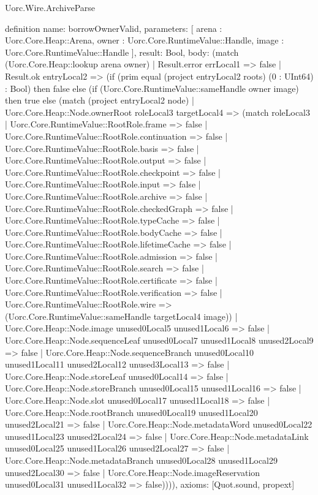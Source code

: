 \begin{lexlean}{Uorc.Wire.ArchiveParse}
\begin{semanticmodule}
definition{
  name: borrowOwnerValid,
  parameters: [
    arena : Uorc.Core.Heap::Arena,
    owner : Uorc.Core.RuntimeValue::Handle,
    image : Uorc.Core.RuntimeValue::Handle
  ],
  result: Bool,
  body: (match (Uorc.Core.Heap::lookup arena owner)
    | Result.error errLocal1 => false
    | Result.ok entryLocal2 => (if (prim equal (project entryLocal2 roots) (0 : UInt64) : Bool) then false else (if (Uorc.Core.RuntimeValue::sameHandle owner image) then true else (match (project entryLocal2 node)
      | Uorc.Core.Heap::Node.ownerRoot roleLocal3 targetLocal4 => (match roleLocal3
        | Uorc.Core.RuntimeValue::RootRole.frame => false
        | Uorc.Core.RuntimeValue::RootRole.continuation => false
        | Uorc.Core.RuntimeValue::RootRole.basis => false
        | Uorc.Core.RuntimeValue::RootRole.output => false
        | Uorc.Core.RuntimeValue::RootRole.checkpoint => false
        | Uorc.Core.RuntimeValue::RootRole.input => false
        | Uorc.Core.RuntimeValue::RootRole.archive => false
        | Uorc.Core.RuntimeValue::RootRole.checkedGraph => false
        | Uorc.Core.RuntimeValue::RootRole.typeCache => false
        | Uorc.Core.RuntimeValue::RootRole.bodyCache => false
        | Uorc.Core.RuntimeValue::RootRole.lifetimeCache => false
        | Uorc.Core.RuntimeValue::RootRole.admission => false
        | Uorc.Core.RuntimeValue::RootRole.search => false
        | Uorc.Core.RuntimeValue::RootRole.certificate => false
        | Uorc.Core.RuntimeValue::RootRole.verification => false
        | Uorc.Core.RuntimeValue::RootRole.wire => (Uorc.Core.RuntimeValue::sameHandle targetLocal4 image))
      | Uorc.Core.Heap::Node.image unused0Local5 unused1Local6 => false
      | Uorc.Core.Heap::Node.sequenceLeaf unused0Local7 unused1Local8 unused2Local9 => false
      | Uorc.Core.Heap::Node.sequenceBranch unused0Local10 unused1Local11 unused2Local12 unused3Local13 => false
      | Uorc.Core.Heap::Node.storeLeaf unused0Local14 => false
      | Uorc.Core.Heap::Node.storeBranch unused0Local15 unused1Local16 => false
      | Uorc.Core.Heap::Node.slot unused0Local17 unused1Local18 => false
      | Uorc.Core.Heap::Node.rootBranch unused0Local19 unused1Local20 unused2Local21 => false
      | Uorc.Core.Heap::Node.metadataWord unused0Local22 unused1Local23 unused2Local24 => false
      | Uorc.Core.Heap::Node.metadataLink unused0Local25 unused1Local26 unused2Local27 => false
      | Uorc.Core.Heap::Node.metadataBranch unused0Local28 unused1Local29 unused2Local30 => false
      | Uorc.Core.Heap::Node.imageReservation unused0Local31 unused1Local32 => false)))),
  axioms: [Quot.sound, propext]
}


\end{semanticmodule}
\end{lexlean}
